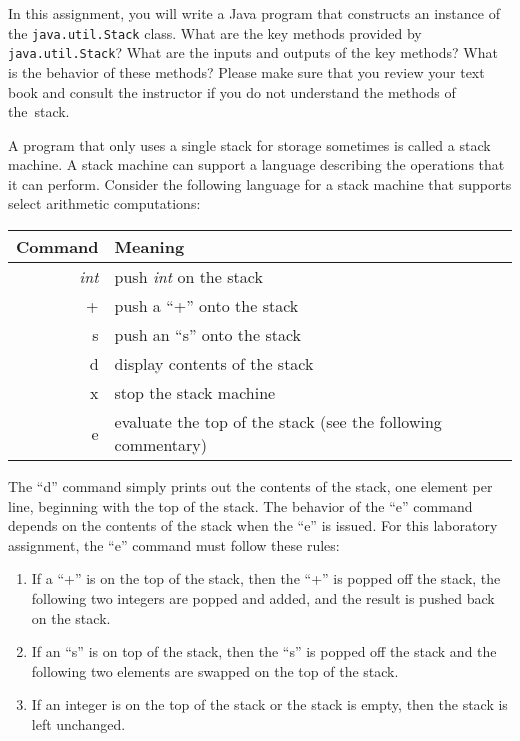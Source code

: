   In this assignment, you will write a Java program that constructs an instance of the {\tt java.util.Stack} class. What
  are the key methods provided by {\tt java.util.Stack}? What are the inputs and outputs of the key methods? What is
  the behavior of these methods? Please make sure that you review your text book and consult the instructor if you do
  not understand the methods of \mbox{the stack}.

  A program that only uses a single stack for storage sometimes is called a stack machine. A stack machine can support a
  language describing the operations that it can perform. Consider the following language for a stack machine that
  supports select arithmetic computations:

\begin{tabular}{r | l}
Command & Meaning \\ \hline
\emph{int} & push \emph{int} on the stack \\
+ & push a ``+'' onto the stack \\
s & push an ``s'' onto the stack \\
d & display contents of the stack \\
x & stop the stack machine \\ 
e & evaluate the top of the stack (see the following commentary) \\
\end{tabular}

  The ``d'' command simply prints out the contents of the stack, one element per line, beginning with the top of the
  stack. The behavior of the ``e'' command depends on the contents of the stack when the ``e'' is issued. For this
  laboratory assignment, the ``e'' command must follow these rules:

\begin{enumerate}

  \item If a ``+'' is on the top of the stack, then the ``+'' is popped off the stack, the following two integers are
    popped and added, and the result is pushed back on the stack.  
  
  \item If an ``s'' is on top of the stack, then the ``s'' is popped off the stack and the following two elements are
    swapped on the top of the stack.  
  
  \item If an integer is on the top of the stack or the stack is empty, then the stack is left unchanged.  

\end{enumerate}


